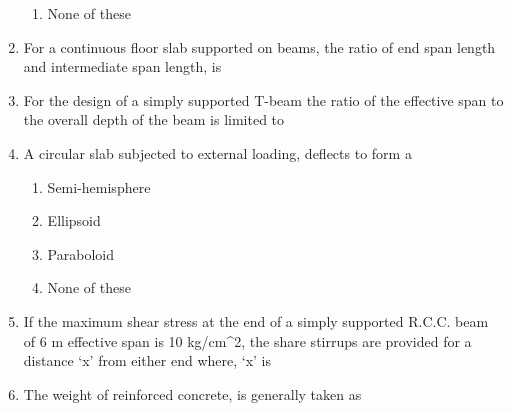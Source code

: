 \documentclass[11pt,a4paper]{article}
\begin{document}
\begin{enumerate}
\begin{enumerate}[label=\Alph*.]
\item{None of these}
\end{enumerate}
\item{For a continuous floor slab supported on beams, the ratio of end span length and intermediate span length, is}
\\
\item{For the design of a simply supported T-beam the ratio of the effective span to the overall depth of the beam is limited to}
\\
\item{A circular slab subjected to external loading, deflects to form a}
\begin{enumerate}[label=\Alph*.]
\item{Semi-hemisphere}
\item{Ellipsoid}
\item{Paraboloid}
\item{None of these}
\end{enumerate}
\item{If the maximum shear stress at the end of a simply supported R.C.C. beam of 6 m effective span is 10 kg/cm\^{}2, the share stirrups are provided for a distance `x' from either end where, `x' is
}
\\\begin{enumerate*}[itemjoin=\qquad, label=\Alph*.]
\item{50 cm}
\item{100 cm}
\item{150 cm}
\item{200 cm}
\end{enumerate*}
\item{The weight of reinforced concrete, is generally taken as}
\\
\end{enumerate}
\end{document}
